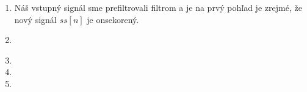 \documentclass[10pt, a4paper, twocolumn]{article}
\begin{document}
\begin{enumerate}[leftmargin=*]
\item Náš vstupný signál sme prefiltrovali filtrom a je na prvý pohľad je zrejmé, že nový signál $ss[n]$ je onsekorený.
\begin{figure}[H]
\centering
{}
\end{figure}

\item
\begin{figure}[H]
\centering
{}
\end{figure}

\item
\item
\item


\end{enumerate}
\end{document}
